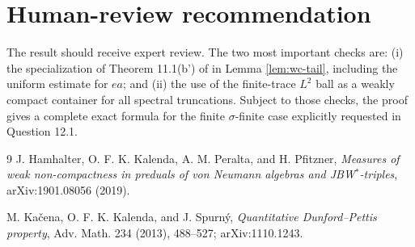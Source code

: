 \documentclass[11pt]{article}
\begin{document}
\section{Human-review recommendation}

The result should receive expert review. The two most important checks are:
(i) the specialization of Theorem 11.1(b') of \cite{HKPP} in Lemma
\ref{lem:wc-tail}, including the uniform estimate for $ea$; and (ii) the use of
the finite-trace $L^2$ ball as a weakly compact container for all spectral
truncations. Subject to those checks, the proof gives a complete exact formula
for the finite $\sigma$-finite case explicitly requested in Question 12.1.

\begin{thebibliography}{9}
J. Hamhalter, O. F. K. Kalenda, A. M. Peralta, and H. Pfitzner,
\emph{Measures of weak non-compactness in preduals of von Neumann algebras and
JBW$^*$-triples}, arXiv:1901.08056 (2019).

M. Ka\v{c}ena, O. F. K. Kalenda, and J. Spurn\'y,
\emph{Quantitative Dunford--Pettis property}, Adv. Math. 234 (2013), 488--527;
arXiv:1110.1243.
\end{thebibliography}
\end{document}
